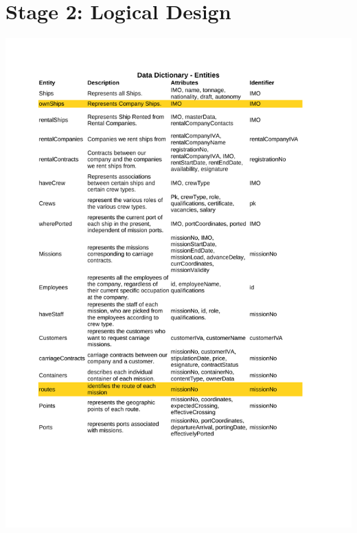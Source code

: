 \documentclass[10pt]{report}
\begin{document}
\chapter*{Stage 2: Logical Design}
\begin{center}
	\includegraphics[trim=0cm 4cm 0cm 0cm,clip=true,height=.85\textheight, width=\textwidth]{DataDictionary1.pdf}
\end{center}
\newpage
\end{document}
